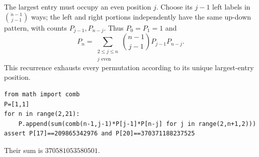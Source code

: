 The largest entry must occupy an even position $ j $. Choose its $ j-1 $ left labels in $\binom{n-1}{j-1}$ ways; the left and right portions independently have the same up-down pattern, with counts $ P_{j-1},P_{n-j}$. Thus $ P_0=P_1=1 $ and
\[P_n=\sum_{\substack{2\le j\le n\\j\text{ even}}}\binom{n-1}{j-1}P_{j-1}P_{n-j}.\]
This recurrence exhausts every permutation according to its unique largest-entry position.
\begin{verbatim}
from math import comb
P=[1,1]
for n in range(2,21):
    P.append(sum(comb(n-1,j-1)*P[j-1]*P[n-j] for j in range(2,n+1,2)))
assert P[17]==209865342976 and P[20]==370371188237525
\end{verbatim}
Their sum is $\boxed{370581053580501}$.
